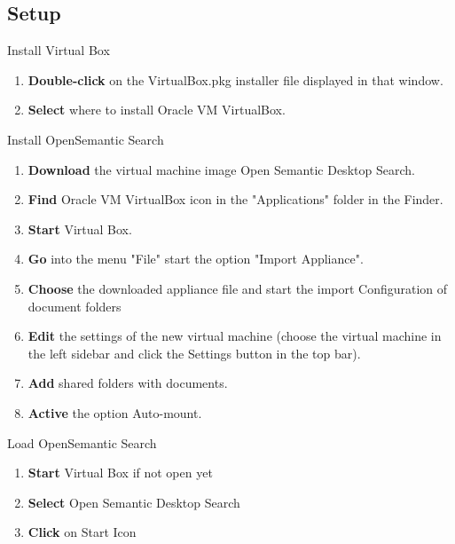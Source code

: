 \documentclass[10pt,a4paper]{article}
\begin{document}
\subsection{Setup}


\begin{textbox}{Install Virtual Box}
 

  


\begin{enumerate}
\item \textbf {Double-click} on the VirtualBox.pkg installer file displayed in that window.
\item \textbf {Select} where to install Oracle VM VirtualBox.

\end{enumerate}


\end{textbox}

\begin{textbox}{Install OpenSemantic Search}
 

  

\begin{enumerate}
\item \textbf{Download} the virtual machine image Open Semantic Desktop Search. 
\item \textbf {Find} Oracle VM VirtualBox icon in the "Applications" folder in the Finder.
\item \textbf{Start} Virtual Box.
\item \textbf{Go} into the menu "File" start the option "Import Appliance".
\item \textbf{Choose} the downloaded appliance file and start the import Configuration of document folders
\item \textbf{Edit} the settings of the new virtual machine (choose the virtual machine in the left sidebar and click the Settings button in the top bar).
\item \textbf{Add} shared folders with documents.
\item \textbf{Active} the option Auto-mount.
\end{enumerate}

\end{textbox}

\begin{textbox}{Load OpenSemantic Search}
 

  

\begin{enumerate}
\item \textbf{Start} Virtual Box if not open yet
\item \textbf{Select} Open Semantic Desktop Search 
\item \textbf{Click} on Start Icon 
\end{enumerate}

\end{textbox}
\end{document}
